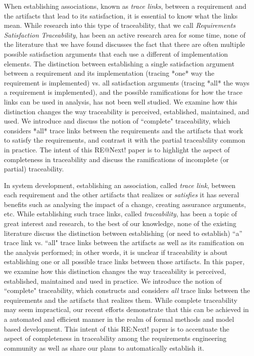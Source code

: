 When establishing associations, known as \emph{ trace links}, between a requirement
and the artifacts that lead to its satisfaction, it is essential to know what the links mean.  
While research into this type of
traceability, that we call \emph{Requirements Satisfaction Traceability},
 has been an active research area for some time, none of the
literature that we have found discusses the fact that there are often multiple possible 
satisfaction arguments that each use a different of implementation elements.
The distinction between establishing a single satisfaction argument 
between a requirement and its implementation (tracing *one* way the
requirement is implemented) vs. all satisfaction arguments (tracing *all* the ways a
requirement is implemented), and the possible ramifications for how the trace
links can be used in analysis, has not been well studied.  We examine how this distinction 
changes the way traceability is perceived, established, maintained, and used.  We introduce
and discuss the notion of ``complete" traceability, which considers *all* trace
links between the requirements and the artifacts that work to satisfy the
requirements, and contrast it with the partial traceability common in
practice.  The intent of this RE@Next! paper is to highlight the aspect of
completeness in traceability and discuss the ramifications of incomplete (or
partial) traceability.

\iffalse

In system development, establishing an association, called \emph{trace link}, between each requirement and the other artifacts that realizes or \emph{satisfies} it has several benefits such as analysing the impact of a change, creating assurance arguments, etc. While establishing such trace links, called \emph{traceability}, has been a topic of great interest and research, to the best of our knowledge, none of the existing literature discuss the distinction between establishing (or need to establish) ``a'' trace link vs. ``all" trace links between the artifacts as well as its ramification on the analysis performed; in other words, it is unclear if traceability is about establishing one or all possible trace links between those artifacts. In this paper, we examine how this distinction changes the way traceability is perceived, established, maintained and used in practice.  We introduce the notion of ``complete" traceability, which constructs and considers {\em all} trace links between the requirements and the artifacts that realizes them. While complete traceability may seem impractical, our recent efforts demonstrate that this can be achieved in a automated and efficient manner in the realm of formal methods and model based development. This intent of this RE:Next! paper is to accentuate the aspect of completeness in traceability among the requirements engineering community as well as share our plans to automatically establish it.

